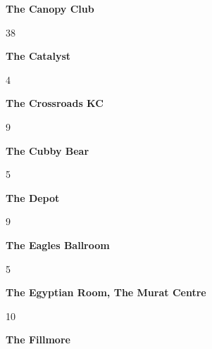 \newline 
\begin{center}\textbf{The Canopy Club}\end{center}
\begin{center}38\end{center} 
\newline 
\begin{center}\textbf{The Catalyst}\end{center}
\begin{center}4\end{center} 
\newline 
\begin{center}\textbf{The Crossroads KC}\end{center}
\begin{center}9\end{center} 
\newline 
\begin{center}\textbf{The Cubby Bear}\end{center}
\begin{center}5\end{center} 
\newline 
\begin{center}\textbf{The Depot}\end{center}
\begin{center}9\end{center} 
\newline 
\begin{center}\textbf{The Eagles Ballroom}\end{center}
\begin{center}5\end{center} 
\newline 
\begin{center}\textbf{The Egyptian Room, The Murat Centre}\end{center}
\begin{center}10\end{center} 
\newline 
\begin{center}\textbf{The Fillmore}\end{center}
